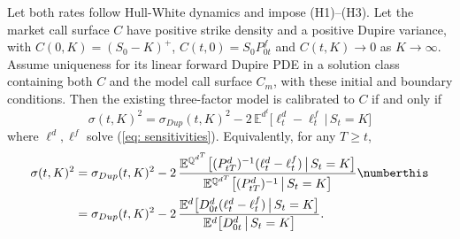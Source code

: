 \begin{prop}\label{prop: main}
Let both rates follow Hull-White dynamics and impose (H1)--(H3).
Let the market call surface $C$ have positive strike density and a positive
Dupire variance, with $C(0,K)=(S_0-K)^+$, $C(t,0)=S_0P^f_{0t}$ and
$C(t,K)\to0$ as $K\to\infty$. Assume uniqueness for its linear forward Dupire
PDE in a solution class containing both $C$ and the model call surface $C_m$,
with these initial and boundary conditions. Then the existing three-factor
model is calibrated to $C$ if and only if
\begin{equation}\label{eq: mainFormula}
\boxed{\;\sigma(t,K)^2=\sigma_{Dup}(t,K)^2-2\,\mathbb{E}^{d^t}\big[\ell^d_t-\ell^f_t\,\big|\,S_t=K\big]\;}
\end{equation}
where $\ell^d,\ell^f$ solve (\ref{eq: sensitivities}). Equivalently, for any $T\geq t$,
\begin{align*}
\sigma(t,K)^2&=\sigma_{Dup}(t,K)^2
-2\,\frac{\mathbb{E}^{\mathbb{Q}^{d^T}}\big[(P^d_{tT})^{-1}(\ell^d_t-\ell^f_t)\,\big|\,S_t=K\big]}{\mathbb{E}^{\mathbb{Q}^{d^T}}\big[(P^d_{tT})^{-1}\,\big|\,S_t=K\big]} \numberthis\label{eq: mainFormulaForward}\\
&=\sigma_{Dup}(t,K)^2
-2\,\frac{\mathbb{E}^{d}\big[D^d_{0t}(\ell^d_t-\ell^f_t)\,\big|\,S_t=K\big]}{\mathbb{E}^{d}\big[D^d_{0t}\,\big|\,S_t=K\big]} .
\end{align*}
\end{prop}
